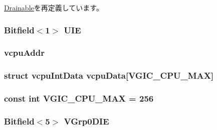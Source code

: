 \hyperlink{classDrainable_a5d74787dedbc4e11c1ab15bf487e61f8}{Drainable}を再定義しています。\hypertarget{classVGic_a0adbea6aeb62d30f03ddc9a25fe11b40}{
\subsubsection[{UIE}]{\setlength{\rightskip}{0pt plus 5cm}Bitfield$<$1$>$ {\bf UIE}}}
\label{classVGic_a0adbea6aeb62d30f03ddc9a25fe11b40}
\hypertarget{classVGic_a6967a675bb97fef5858618111567aba0}{
\subsubsection[{vcpuAddr}]{ {\bf vcpuAddr}}}
\label{classVGic_a6967a675bb97fef5858618111567aba0}
\hypertarget{classVGic_a98b5031733bb2cb7d20cf68a3a1ac460}{
\subsubsection[{vcpuData}]{\setlength{\rightskip}{0pt plus 5cm}struct vcpuIntData {\bf vcpuData}\mbox{[}{\bf VGIC\_\-CPU\_\-MAX}\mbox{]}}}
\label{classVGic_a98b5031733bb2cb7d20cf68a3a1ac460}
\hypertarget{classVGic_abdf6630d700683c52d9cd03f11d660ac}{
\subsubsection[{VGIC\_\-CPU\_\-MAX}]{\setlength{\rightskip}{0pt plus 5cm}const int {\bf VGIC\_\-CPU\_\-MAX} = 256}}
\label{classVGic_abdf6630d700683c52d9cd03f11d660ac}
\hypertarget{classVGic_affc0c4742ef1d61df5a0e8e8b2cee33b}{
\subsubsection[{VGrp0DIE}]{\setlength{\rightskip}{0pt plus 5cm}Bitfield$<$5$>$ {\bf VGrp0DIE}}}
